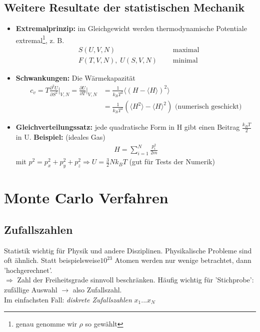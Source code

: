 \documentclass[12pt]{article}
\begin{document}
\subsection{Weitere Resultate der statistischen Mechanik}
\begin{itemize}
\item \textbf{Extremalprinzip:} im Gleichgewicht werden thermodynamische Potentiale extremal\footnote{genau genomme wir $\rho$ so gewählt}, z. B. 
\begin{align}
& S(U,V,N) \, && \mbox{ maximal} \\
& F(T,V,N), \; U(S,V,N) \; && \mbox{ minimal}
\end{align}
\item \textbf{Schwankungen:} Die Wärmekapazität
\begin{align}
c_v = T \frac{\partial ^2 U}{\partial S ^2} \biggr\vert_{V,N} = \frac{\partial U}{\partial T}  \biggr\vert_{V,N} &= \frac{1}{k_B T^2} \langle (H - \langle H \rangle)^2\rangle \\
&= \frac{1}{k_B T^2} \left( \langle H^2 \rangle - \langle H \rangle ^2 \right) \mbox{ (numerisch geschickt)}
\end{align}
\item \textbf{Gleichverteilungssatz:} jede quadratische Form in H gibt einen Beitrag $\frac{k_B T}{2}$ in U. 
\textbf{Beispiel:} (ideales Gas) 
\begin{align*}
H = \sum_{i=1}^N \frac{p_i ^2}{2m}
\end{align*}
mit $p^2 = p_x^2 + p_y^2 + p_z^2 \Rightarrow U= \frac{3}{2} N k_B T$ (gut für Tests der Numerik) 
\end{itemize}

\section{Monte Carlo Verfahren}
\subsection{Zufallszahlen}
Statistik wichtig für Physik und andere Disziplinen. Physikalische Probleme sind oft ähnlich. Statt beispielsweise$10^{23}$ Atomen werden nur wenige betrachtet, dann 'hochgerechnet'.  \\
$\Rightarrow$ Zahl der Freiheitsgrade sinnvoll beschränken. Häufig wichtig für 'Stichprobe': zufällige Auswahl  $\to$ also Zufallszahl.\\
Im einfachsten Fall: \textit{diskrete Zufallszahlen} $x_1 ... x_N$\\
\end{document}
